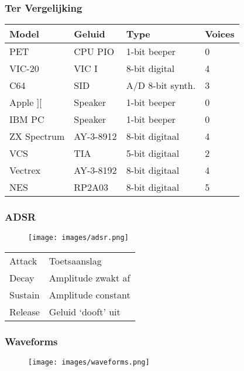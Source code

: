 \begin{frame}
\frametitle{Ter Vergelijking}

\begin{tabular}{|l|l|l|l|}
\hline Model & Geluid & Type & Voices \\ \hline
PET & CPU PIO & 1-bit beeper & 0 \\
VIC-20 & VIC I & 8-bit digital & 4 \\
C64 & SID & A/D 8-bit synth. & 3 \\ \hline
Apple ][ & Speaker & 1-bit beeper & 0 \\
IBM PC & Speaker & 1-bit beeper & 0 \\
ZX Spectrum & AY-3-8912 & 8-bit digitaal & 4 \\ \hline
VCS & TIA & 5-bit digitaal & 2 \\
Vectrex & AY-3-8192 & 8-bit digitaal & 4 \\
NES & RP2A03 & 8-bit digitaal & 5 \\ \hline
\end{tabular}

\end{frame}


\begin{frame}
\frametitle{ADSR}

\begin{figure}
\texttt{[image: images/adsr.png]}
\end{figure}

\begin{tabular}{l|l}
Attack & Toetsaanslag \\
Decay & Amplitude zwakt af \\
Sustain & Amplitude constant \\
Release & Geluid `dooft' uit \\
\end{tabular}

\end{frame}


\begin{frame}
\frametitle{Waveforms}

\begin{figure}
\texttt{[image: images/waveforms.png]}
\end{figure}

\end{frame}

